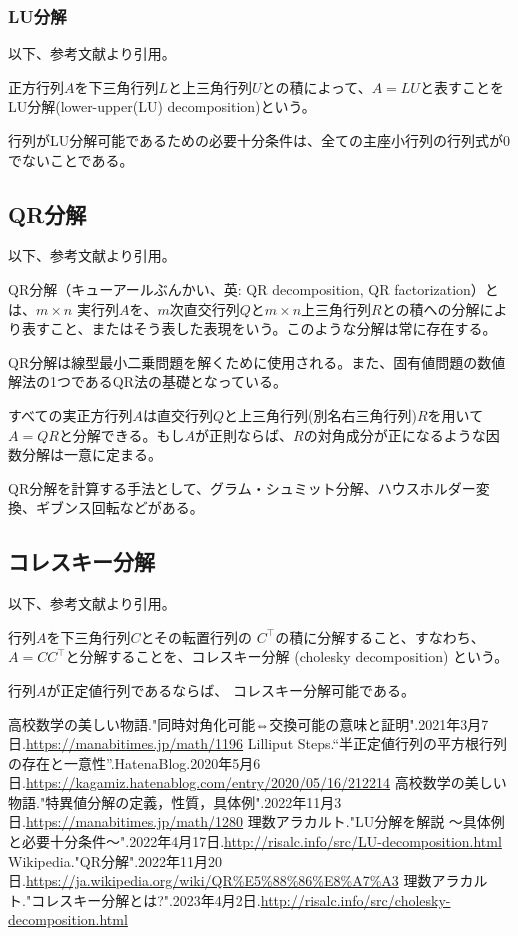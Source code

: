 \documentclass[a4paper, 10pt, dvipdfmx]{jlreq}
\begin{document}
\subsubsection*{LU分解}

以下、参考文献\cite{site:4}より引用。

正方行列$A$を下三角行列$L$と上三角行列$U$との積によって、$A=LU$と表すことをLU分解(lower-upper(LU) decomposition)という。

行列がLU分解可能であるための必要十分条件は、全ての主座小行列の行列式が0でないことである。

\subsection*{QR分解}

以下、参考文献\cite{site:5}より引用。

QR分解（キューアールぶんかい、英: QR decomposition, QR factorization）とは、$m \times n$ 実行列$A$を、$m$次直交行列$Q$と$m \times  n$上三角行列$R$との積への分解により表すこと、またはそう表した表現をいう。このような分解は常に存在する。

QR分解は線型最小二乗問題を解くために使用される。また、固有値問題の数値解法の1つであるQR法の基礎となっている。

すべての実正方行列$A$は直交行列$Q$と上三角行列(別名右三角行列)$R$を用いて$A=QR$と分解できる。もし$A$が正則ならば、$R$の対角成分が正になるような因数分解は一意に定まる。

QR分解を計算する手法として、グラム・シュミット分解、ハウスホルダー変換、ギブンス回転などがある。

\subsection*{コレスキー分解}

以下、参考文献\cite{site:6}より引用。

行列$A$を下三角行列$C$とその転置行列の $C^\top $の積に分解すること、すなわち、$A=CC^\top $と分解することを、コレスキー分解 (cholesky decomposition) という。

行列$A$が正定値行列であるならば、 コレスキー分解可能である。

\begin{thebibliography}{9}
  高校数学の美しい物語."同時対角化可能⇔交換可能の意味と証明".2021年3月7日.\url{https://manabitimes.jp/math/1196}
  Lilliput Steps.``半正定値行列の平方根行列の存在と一意性''.HatenaBlog.2020年5月6日.\url{https://kagamiz.hatenablog.com/entry/2020/05/16/212214}
  高校数学の美しい物語."特異値分解の定義，性質，具体例".2022年11月3日.\url{https://manabitimes.jp/math/1280}
  理数アラカルト."LU分解を解説 ～具体例と必要十分条件～".2022年4月17日.\url{http://risalc.info/src/LU-decomposition.html}
  Wikipedia."QR分解".2022年11月20日.\url{https://ja.wikipedia.org/wiki/QR%E5%88%86%E8%A7%A3}
  理数アラカルト."コレスキー分解とは?".2023年4月2日.\url{http://risalc.info/src/cholesky-decomposition.html}
\end{thebibliography}
\end{document}
